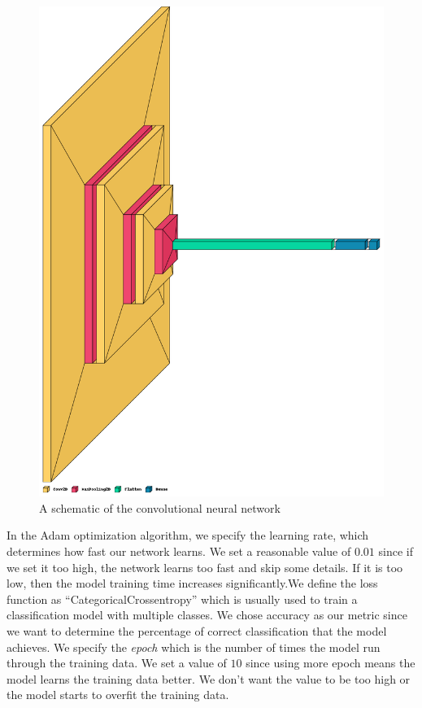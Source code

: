 \documentclass[11pt,a4paper]{article}
\begin{document}
 \begin{figure}[h!]
 \centering
  \includegraphics[width=0.85\linewidth]{schema.png}
  \caption{A schematic of the convolutional neural network}
  \label{schema}
\end{figure}

\noindent
In the Adam optimization algorithm, we specify the learning rate, which determines how fast our network learns. We set a reasonable value of $0.01$ since if we set it too high, the network learns too fast and skip some details. If it is too low, then the model training time increases significantly.We define the loss function as ``CategoricalCrossentropy'' which is usually used to train a classification model with multiple classes. We chose accuracy as our metric since we want to determine the percentage of correct classification that the model achieves. We specify the \emph{epoch} which is the number of times the model run through the training data. We set a value of $10$ since using more epoch means the model learns the training data better. We don't want the value to be too high or the model starts to overfit the training data. 
\end{document}
